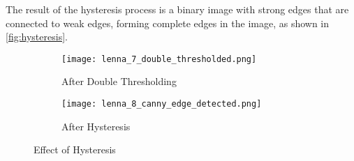The result of the hysteresis process is a binary image with strong edges that are connected to weak edges, forming complete edges in the image, as shown in \autoref{fig:hysteresis}.

\begin{figure}[ht]
    \centering
    \begin{subfigure}[b]{0.4\textwidth}
        \centering
        \texttt{[image: lenna\_7\_double\_thresholded.png]}
        \caption{After Double Thresholding}
    \end{subfigure}
    \hfill
    \begin{subfigure}[b]{0.4\textwidth}
        \centering
        \texttt{[image: lenna\_8\_canny\_edge\_detected.png]}
        \caption{After Hysteresis}
    \end{subfigure}
    \caption{Effect of Hysteresis}
    \label{fig:hysteresis}
\end{figure}
